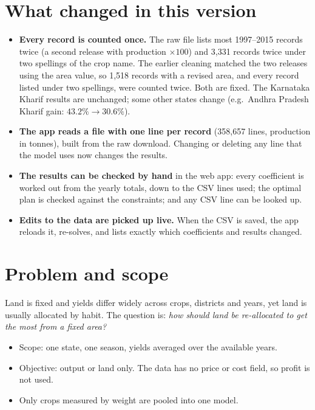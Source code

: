 \documentclass[11pt,a4paper]{article}
\begin{document}
\section*{What changed in this version}
\begin{itemize}
  \item \textbf{Every record is counted once.} The raw file lists most 1997--2015 records twice
        (a second release with production $\times100$) and 3,331 records twice under two spellings
        of the crop name. The earlier cleaning matched the two releases using the area value,
        so 1,518 records with a revised area, and every record listed under two spellings,
        were counted twice. Both are fixed. The Karnataka Kharif results are unchanged; some
        other states change (e.g.\ Andhra Pradesh Kharif gain: $43.2\% \to 30.6\%$).
  \item \textbf{The app reads a file with one line per record} (358,657 lines, production in tonnes),
        built from the raw download. Changing or deleting any line that the model uses now
        changes the results.
  \item \textbf{The results can be checked by hand} in the web app: every coefficient is worked out
        from the yearly totals, down to the CSV lines used; the optimal plan is checked against
        the constraints; and any CSV line can be looked up.
  \item \textbf{Edits to the data are picked up live.} When the CSV is saved, the app reloads it,
        re-solves, and lists exactly which coefficients and results changed.
\end{itemize}

\section{Problem and scope}
Land is fixed and yields differ widely across crops, districts and years, yet land is usually
allocated by habit. The question is: \emph{how should land be re-allocated to get the most from
a fixed area?}

\begin{itemize}
  \item Scope: one state, one season, yields averaged over the available years.
  \item Objective: output or land only. The data has no price or cost field, so profit is not used.
  \item Only crops measured by weight are pooled into one model.
\end{itemize}
\end{document}
